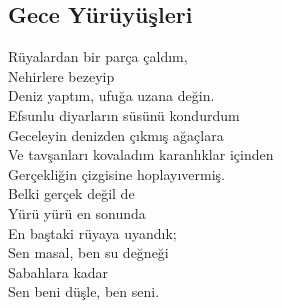 \subsection{Gece Yürüyüşleri}

Rüyalardan bir parça çaldım, \\
Nehirlere bezeyip \\
Deniz yaptım, ufuğa uzana değin. \\
Efsunlu diyarların süsünü kondurdum \\
Geceleyin denizden çıkmış ağaçlara \\
Ve tavşanları kovaladım karanlıklar içinden \\
Gerçekliğin çizgisine hoplayıvermiş. \\

\noindent\newline
Belki gerçek değil de \\
Yürü yürü en sonunda \\
En baştaki rüyaya uyandık; \\
Sen masal, ben su değneği \\
Sabahlara kadar \\
Sen beni düşle, ben seni. \\